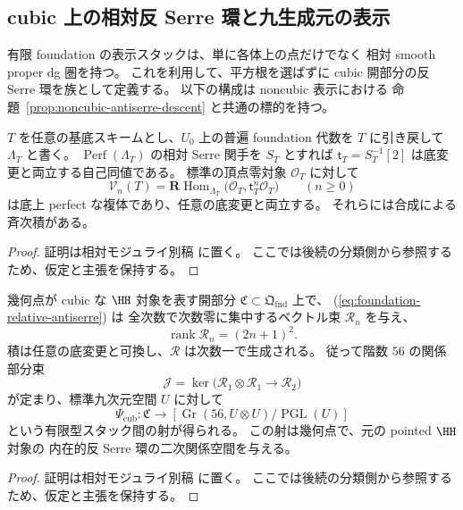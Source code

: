\subsection{cubic 上の相対反 Serre 環と九生成元の表示}
\label{subsec:cubic-relative-antiserre}

有限 foundation の表示スタックは、単に各体上の点だけでなく
相対 smooth proper dg 圏を持つ。
これを利用して、平方根を選ばずに
cubic 開部分の反 Serre 環を族として定義する。
以下の構成は noncubic 表示における
命題~\ref{prop:noncubic-antiserre-descent} と共通の標的を持つ。

\begin{lemma}
\label{lem:foundation-relative-antiserre-perfect}
$T$ を任意の基底スキームとし、$U_0$ 上の普遍 foundation 代数を
$T$ に引き戻して $\Lambda_T$ と書く。
$\operatorname{Perf}(\Lambda_T)$ の相対 Serre 関手を $S_T$ とすれば
$\mathsf t_T=S_T^{-1}[2]$ は底変更と両立する自己同値である。
標準の頂点零対象 $\mathcal O_T$ に対して
\[
 \mathscr V_n(T)=
 \mathbf R\operatorname{Hom}_{\Lambda_T}
   \bigl(\mathcal O_T,\mathsf t_T^n\mathcal O_T\bigr)
 \qquad(n\ge0)
 \tag{F-AS}\label{eq:foundation-relative-antiserre}
\]
は底上 perfect な複体であり、任意の底変更と両立する。
それらには合成による斉次積がある。
\end{lemma}
\begin{proof}
証明は相対モジュライ別稿 \cite[\texttt{foundation_stack} 節]{QuadricModuli2026} に置く。
ここでは後続の分類側から参照するため、仮定と主張を保持する。
\end{proof}

\begin{proposition}
\label{prop:cubic-relative-antiserre-grassmann}
幾何点が cubic な $\HH$ 対象を表す開部分
$\mathfrak C\subset\mathfrak Q_{\mathrm{fnd}}$ 上で、
(\ref{eq:foundation-relative-antiserre}) は
全次数で次数零に集中するベクトル束 $\mathscr R_n$ を与え、
\[
 \operatorname{rank}\mathscr R_n=(2n+1)^2 .
\]
積は任意の底変更と可換し、$\mathscr R$ は次数一で生成される。
従って階数 $56$ の関係部分束
\[
 \mathscr J=\ker\bigl(
 \mathscr R_1\otimes\mathscr R_1\longrightarrow\mathscr R_2
 \bigr)
\]
が定まり、標準九次元空間 $U$ に対して
\[
 \Psi_{\mathrm{cub}}:
 \mathfrak C\longrightarrow
 \left[\operatorname{Gr}(56,U\otimes U)/\operatorname{PGL}(U)\right]
 \tag{C-Gr}\label{eq:cubic-antiserre-grassmann}
\]
という有限型スタック間の射が得られる。
この射は幾何点で、元の pointed $\HH$ 対象の
内在的反 Serre 環の二次関係空間を与える。
\end{proposition}
\begin{proof}
証明は相対モジュライ別稿 \cite[\texttt{foundation_stack} 節]{QuadricModuli2026} に置く。
ここでは後続の分類側から参照するため、仮定と主張を保持する。
\end{proof}

